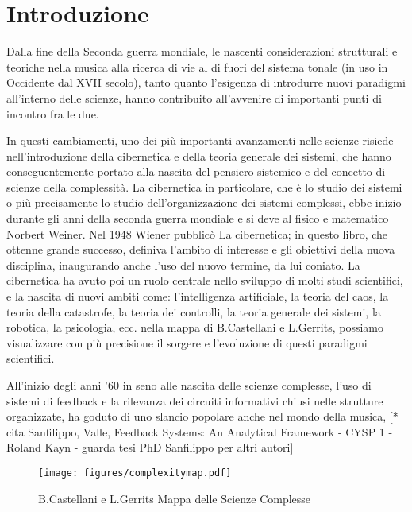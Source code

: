 \section{Introduzione}
\label{sec:introduzione}

Dalla fine della Seconda guerra mondiale, le nascenti considerazioni strutturali e teoriche 
nella musica alla ricerca di vie al di fuori del sistema tonale (in uso in Occidente dal XVII secolo),
tanto quanto l'esigenza di introdurre nuovi paradigmi all'interno delle scienze,
hanno contribuito all'avvenire di importanti punti di incontro fra le due.

In questi cambiamenti, uno dei più importanti avanzamenti nelle scienze 
risiede nell'introduzione della
cibernetica e della teoria generale dei sistemi, che hanno conseguentemente
portato alla nascita del pensiero sistemico e del concetto di scienze della complessità.
La cibernetica in particolare, che è lo studio dei sistemi o più precisamente lo studio
dell'organizzazione dei sistemi complessi, ebbe inizio durante gli anni della seconda guerra mondiale 
e si deve al fisico e matematico Norbert Weiner.
Nel 1948 Wiener pubblicò La cibernetica; in questo libro, che ottenne grande successo,
definiva l'ambito di interesse e gli obiettivi della nuova disciplina,
inaugurando anche l'uso del nuovo termine, da lui coniato.
La cibernetica ha avuto poi un ruolo centrale nello sviluppo di molti studi scientifici, e la nascita 
di nuovi ambiti come: l'intelligenza artificiale, la teoria del caos, la teoria della catastrofe,
la teoria dei controlli, la teoria generale dei sistemi, la robotica, la psicologia,
ecc.
nella mappa di B.Castellani e L.Gerrits, possiamo visualizzare con più precisione il sorgere e l'evoluzione
di questi paradigmi scientifici.

All'inizio degli anni '60 in seno alle nascita delle scienze complesse,
l'uso di sistemi di feedback e la rilevanza dei circuiti informativi chiusi nelle strutture organizzate,
ha goduto di uno slancio popolare anche nel mondo della musica,
[* cita Sanfilippo, Valle, Feedback Systems: An Analytical Framework - CYSP 1 - Roland Kayn - 
guarda tesi PhD Sanfilippo per altri autori]

\clearpage 

\begin{figure}[!h]
    \centering
    \texttt{[image: figures/complexitymap.pdf]}
    \caption{B.Castellani e L.Gerrits Mappa delle Scienze Complesse}
    \label{fig:figure}
\end{figure}

\clearpage
